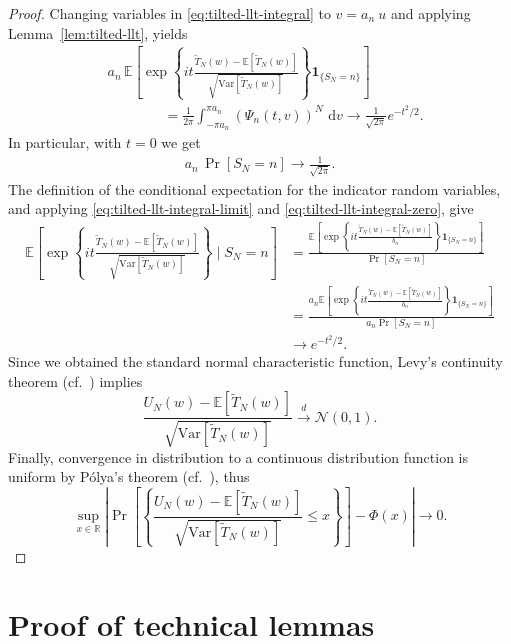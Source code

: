 \documentclass[11pt]{article}
\numberwithin{equation}{section}
\newcommand{\dd}{\,\mathrm{d}}
\newcommand{\Prp}[1]{\Pr\left[#1 \right]}
\newcommand{\reals}{\mathbb R}
\newcommand{\Ncal}{\mathcal{N}}
\newcommand{\one}{\mathbf{1}}
\newcommand{\Var}[1]{\mathrm{Var}\left[ #1\right]}
\newcommand{\ex}[1]{\ensuremath{\mathbb{E}\left[ #1\right]}}
\begin{document}
\begin{proof}
Changing variables in \eqref{eq:tilted-llt-integral} to $v=a_n\ u$ and applying Lemma~\ref{lem:tilted-llt}, yields
\begin{align}
& a_n\,
\ex{
\exp\left\{it\frac{\tilde T_N(w)-\ex{\tilde T_N(w)}}{\sqrt{\Var{\tilde T_N(w)}}}\right\}
\one_{\{S_N=n\}}} \nonumber \\
& \qquad \qquad =
\frac1{2\pi}\int_{-\pi a_n}^{\pi a_n}\left(\Psi_n(t,v) \right)^N\,\dd v \to \frac1{\sqrt{2\pi}}e^{-t^2/2}.
\label{eq:tilted-llt-integral-limit}
\end{align}
In particular, with $t=0$ we get
\begin{align}
a_n\,\Prp{S_N=n}
\longrightarrow
\frac1{\sqrt{2\pi}}.
\label{eq:tilted-llt-integral-zero}
\end{align}
The definition of the conditional expectation for the indicator random variables, and applying \eqref{eq:tilted-llt-integral-limit} and \eqref{eq:tilted-llt-integral-zero}, give
\begin{align*}
    \ex{
\exp\left\{it\frac{\tilde{T}_N(w)-\ex{\tilde{T}_N(w)}}
{\sqrt{\Var{\tilde T_N(w)}}}\right\} \mid S_N=n} & = \frac{\ex{
    \exp\left\{it\frac{\tilde T_N(w)-\ex{\tilde T_N(w)}}{b_n}\right\}
    \one_{\{S_N=n\}}}}{\Prp{S_N=n}} \\
    & = \frac{a_n \ex{
        \exp\left\{it\frac{\tilde T_N(w)-\ex{\tilde T_N(w)}}{b_n}\right\}
        \one_{\{S_N=n\}}}}{a_n \Prp{S_N=n}} \\
        & \longrightarrow e^{-t^2/2}.
\end{align*}
Since we obtained the standard normal characteristic function, Levy's continuity theorem (cf.\ \cite[Thm.~2.13]{van2000asymptotic}) implies
\[
\frac{U_N(w)-\ex{\tilde T_N(w)}}
{\sqrt{\Var{\tilde T_N(w)}}}
\overset{d}{\longrightarrow} \Ncal(0,1).
\]
Finally, convergence in distribution to a continuous distribution function is uniform by P\'olya's theorem (cf.\ \cite[Lem.~2.11]{van2000asymptotic}), thus
\[
\sup_{x\in\reals}
\left| \Prp{\left\{ \frac{U_N(w)-\ex{\tilde T_N(w)}}
{\sqrt{\Var{\tilde T_N(w)}}} \le x \right\}} -\Phi(x) \right|
\longrightarrow 0.
\]
\end{proof}

\section{Proof of technical lemmas}
\label{sec:proofs-app}
\end{document}
